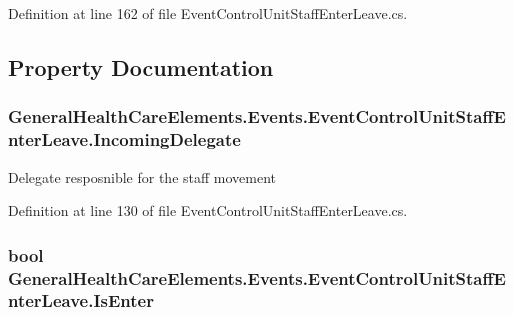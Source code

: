 Definition at line 162 of file Event\+Control\+Unit\+Staff\+Enter\+Leave.\+cs.



\subsection{Property Documentation}
\subsubsection[{\texorpdfstring{Incoming\+Delegate}{IncomingDelegate}}]{ General\+Health\+Care\+Elements.\+Events.\+Event\+Control\+Unit\+Staff\+Enter\+Leave.\+Incoming\+Delegate\hspace{0.3cm}{\ttfamily [get]}}\hypertarget{class_general_health_care_elements_1_1_events_1_1_event_control_unit_staff_enter_leave_a1b793ec64930fe5c53777b76d29bf9ed}{}\label{class_general_health_care_elements_1_1_events_1_1_event_control_unit_staff_enter_leave_a1b793ec64930fe5c53777b76d29bf9ed}


Delegate resposnible for the staff movement 



Definition at line 130 of file Event\+Control\+Unit\+Staff\+Enter\+Leave.\+cs.

\subsubsection[{\texorpdfstring{Is\+Enter}{IsEnter}}]{\setlength{\rightskip}{0pt plus 5cm}bool General\+Health\+Care\+Elements.\+Events.\+Event\+Control\+Unit\+Staff\+Enter\+Leave.\+Is\+Enter\hspace{0.3cm}{\ttfamily [get]}}\hypertarget{class_general_health_care_elements_1_1_events_1_1_event_control_unit_staff_enter_leave_a8ec37ba23d4b39d58ff93f45af63d507}{}\label{class_general_health_care_elements_1_1_events_1_1_event_control_unit_staff_enter_leave_a8ec37ba23d4b39d58ff93f45af63d507}


